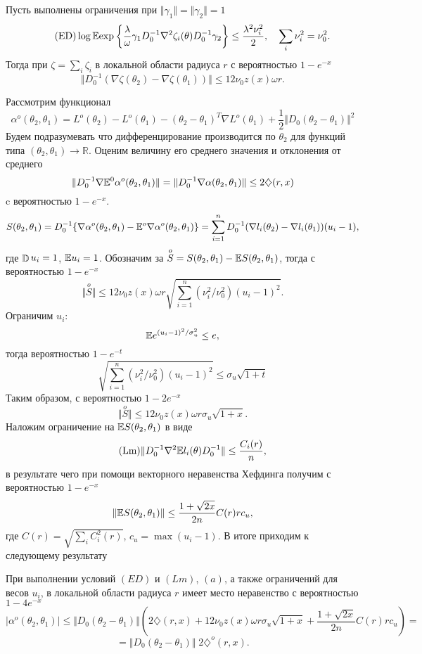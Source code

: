 \begin{lemma}
Пусть выполнены ограничения при $\Vert \gamma_1 \Vert = \Vert \gamma_2 \Vert = 1$
\[\tag{ED}
\log \mathrm{{\mathbb E}} \text{exp} \left\{
\frac{\lambda}{\omega} \gamma_1 D_0^{-1}  \nabla^2 \zeta_i (\theta) D_0^{-1} \gamma_2 
\right\}
\leq \frac{\lambda^2 \nu_i^2}{2}, 
\quad \sum_i  \nu_i^2  = \nu_0^2.
\] 
Тогда при $\zeta = \sum_i \zeta_i$ в локальной области радиуса $r$ с вероятностью $1- e^{-x}$
\[
\Vert D_0^{-1} (\nabla \zeta (\theta_2) -  \nabla \zeta (\theta_1))  \Vert
\leq 12 \nu_0 z(x) \omega r.
\]
\end{lemma}
Рассмотрим функционал 
\[
\alpha^o(\theta_2, \theta_1) = L^{o}(\theta_2) - L^{o}(\theta_1) - (\theta_2 - \theta_1)^{T} \nabla  L^{o}(\theta_1) + \frac{1}{2} \Vert  D_0(\theta_2 - \theta_1) \Vert^2
\]
Будем подразумевать что дифференцирование производится по $\theta_2$ для функций типа $(\theta_2, \theta_1) \to \mathbb{R}$.
Оценим величину его среднего значения и отклонения от среднего 
\[
\Vert D_0^{-1} \nabla \mathrm{{\mathbb E}}^{0} \alpha^o(\theta_2, \theta_1) \Vert =   \Vert D_0^{-1} \nabla  \alpha(\theta_2, \theta_1) \Vert 
\leq
2 \diamondsuit(r,x)
\]
c вероятностью $1 - e^{-x}$. 
\[
S(\theta_2, \theta_1) = D_0^{-1} \{\nabla \alpha^o(\theta_2, \theta_1) -  \mathrm{{\mathbb E}}^{o} \nabla \alpha^o(\theta_2, \theta_1) \}
= \sum_{i=1}^{n} D_0^{-1} (\nabla l_i(\theta_2) - \nabla l_i(\theta_1))  (u_i-1),
\]
где $\mathop{\mathbb{D}}\nolimits u_i = 1$, $\mathrm{{\mathbb E}} u_i = 1$. 
Обозначим за $ \overset{o}{S} = S(\theta_2, \theta_1) - \mathrm{{\mathbb E}} S(\theta_2, \theta_1)$, тогда с вероятностью $1- e^{-x}$
\[
\Vert \overset{o}{S}  \Vert \leq 
12 \nu_0  z(x) \omega r \sqrt{\sum_{i=1}^{n} (\nu_i^2 / \nu_0^2) (u_i - 1)^2 } .
\] 
Ограничим $u_i$:
\[
\mathrm{{\mathbb E}} e^{(u_i - 1)^2 / \sigma_u^2} \leq e,
\] 
тогда вероятностью $1 - e^{-t}$ 
\[
\sqrt{\sum_{i=1}^{n} (\nu_i^2 / \nu_0^2) (u_i - 1)^2 } \leq \sigma_u \sqrt{1+t} 
\]
Таким образом, с  вероятностью $1- 2e^{-x}$
\[
\Vert \overset{o}{S}  \Vert \leq 
12 \nu_0  z(x) \omega r \sigma_u \sqrt{1+x}. 
\]
Наложим ограничение на  $\mathrm{{\mathbb E}} S(\theta_2, \theta_1)$ в виде
\[\tag{Lm}
\Vert D_0^{-1} \nabla^2 \mathrm{{\mathbb E}} l_i (\theta)  D_0^{-1} \Vert \leq
\frac{C_i(r)}{n},
\]
в результате чего при помощи векторного неравенства Хефдинга получим с вероятностью $1 - e^{-x}$
\[
\Vert \mathrm{{\mathbb E}} S(\theta_2, \theta_1) \Vert \leq 
\frac{1 + \sqrt{2x}}{2n}  C(r) r c_u,
\] 
где $C(r) = \sqrt{\sum_i C_i^2 (r)}$, $c_u = \max (u_i - 1)$. В итоге приходим к следующему результату 

\begin{theorem}
\label{wilks_boot}
При выполнении условий $(ED)$ и $(Lm)$, $(a)$, а также ограничений для весов $u_i$, в локальной области радиуса $r$ имеет место неравенство с вероятностью $1 - 4 e^{-x}$
\[\tag{a'}
| \alpha^o(\theta_2, \theta_1) |
\leq 
\Vert D_0 (\theta_2 - \theta_1)  \Vert
\left(
2 \diamondsuit(r,x) + 12 \nu_0  z(x) \omega r \sigma_u \sqrt{1+x} + 
\frac{1 + \sqrt{2x}}{2n}  C(r) r c_u
\right)  = 
\]
\[
 = \Vert D_0 (\theta_2 - \theta_1)  \Vert \; 2 \diamondsuit^{o}(r,x). 
\] 
\end{theorem}

